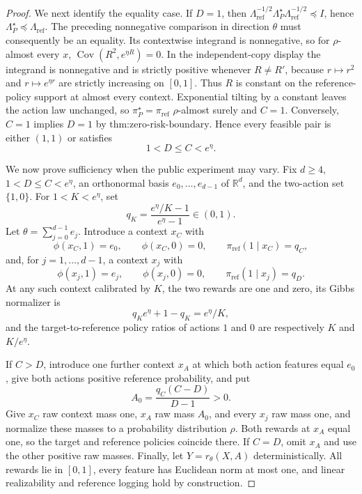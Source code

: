 \documentclass{article}
\begin{document}
\begin{proof}
We next identify the equality case. If \(D=1\), then
\(\Lambda_{\mathrm{ref}}^{-1/2}\Lambda_P^\star\Lambda_{\mathrm{ref}}^{-1/2}\preceq I\), hence \(\Lambda_P^\star\preceq\Lambda_{\mathrm{ref}}\). The preceding nonnegative comparison in direction \(\theta\) must consequently be an equality. Its contextwise integrand is nonnegative, so for \(\rho\)-almost every \(x\),
\(\operatorname{Cov}(R^2,e^{\eta R})=0\). In the independent-copy display the integrand is nonnegative and is strictly positive whenever \(R\ne R'\), because \(r\mapsto r^2\) and \(r\mapsto e^{\eta r}\) are strictly increasing on \([0,1]\). Thus \(R\) is constant on the reference-policy support at almost every context. Exponential tilting by a constant leaves the action law unchanged, so \(\pi_P^\star=\pi_{\mathrm{ref}}\) \(\rho\)-almost surely and \(C=1\). Conversely, \(C=1\) implies \(D=1\) by \(\text{thm:zero-risk-boundary}\). Hence every feasible pair is either \((1,1)\) or satisfies
\[
1<D\le C<e^\eta.
\]

We now prove sufficiency when the public experiment may vary. Fix \(d\ge4\), \(1<D\le C<e^\eta\), an orthonormal basis \(e_0,\ldots,e_{d-1}\) of \(\mathbb R^d\), and the two-action set \(\{1,0\}\). For \(1<K<e^\eta\), set
\[
q_K=\frac{e^\eta/K-1}{e^\eta-1}\in(0,1).
\]
Let \(\theta=\sum_{j=0}^{d-1}e_j\). Introduce a context \(x_C\) with
\[
\phi(x_C,1)=e_0,\qquad \phi(x_C,0)=0,
\qquad \pi_{\mathrm{ref}}(1\mid x_C)=q_C,
\]
and, for \(j=1,\ldots,d-1\), a context \(x_j\) with
\[
\phi(x_j,1)=e_j,\qquad \phi(x_j,0)=0,
\qquad \pi_{\mathrm{ref}}(1\mid x_j)=q_D.
\]
At any such context calibrated by \(K\), the two rewards are one and zero, its Gibbs normalizer is
\[
q_K e^\eta+1-q_K=e^\eta/K,
\]
and the target-to-reference policy ratios of actions \(1\) and \(0\) are respectively \(K\) and \(K/e^\eta\).

If \(C>D\), introduce one further context \(x_A\) at which both action features equal \(e_0\), give both actions positive reference probability, and put
\[
A_0=\frac{q_C(C-D)}{D-1}>0.
\]
Give \(x_C\) raw context mass one, \(x_A\) raw mass \(A_0\), and every \(x_j\) raw mass one, and normalize these masses to a probability distribution \(\rho\). Both rewards at \(x_A\) equal one, so the target and reference policies coincide there. If \(C=D\), omit \(x_A\) and use the other positive raw masses. Finally, let \(Y=r_\theta(X,A)\) deterministically. All rewards lie in \([0,1]\), every feature has Euclidean norm at most one, and linear realizability and reference logging hold by construction.


\end{proof}
\end{document}
